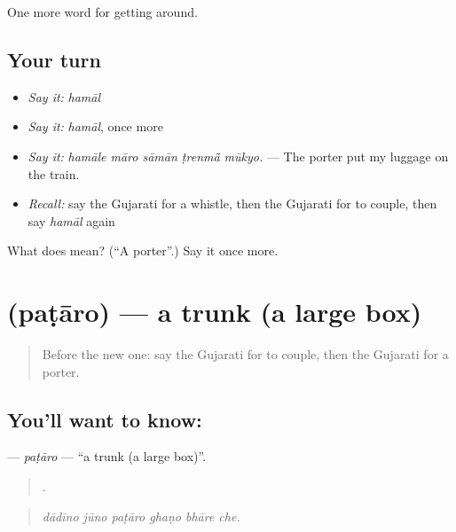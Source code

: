 \begin{grammarlens}[title={What you've built}]
One more word for getting around.
\end{grammarlens}

\subsection*{Your turn}
\begin{itemize}
\raggedright
  \item \emph{Say it:} \emph{hamāl}
  \item \emph{Say it:} \emph{hamāl}, once more
  \item \emph{Say it:} \emph{hamāle māro sāmān ṭrenmā̃ mūkyo.} — The porter put my luggage on the train.
  \item \emph{Recall:} say the Gujarati for a whistle, then the Gujarati for to couple, then say \emph{hamāl} again
\end{itemize}

\begin{tcolorbox}[breakable,colback=teal!4,colframe=teal!35!black,title={Before you move on}]
What does  mean? (\textquotedblleft{}A porter\textquotedblright{}.) Say it once more.
\end{tcolorbox}
\section[\texorpdfstring{\gu{પટારો} (paṭāro)}{પટારો (paṭāro)}]{ (paṭāro) — a trunk (a large box)}

\label{lesson:GU-C394-pataro}



\begin{quote}
Before the new one: say the Gujarati for to couple, then the Gujarati for a porter.
\end{quote}

\subsection*{You'll want to know: }
\textbf{} — \emph{paṭāro} — \textquotedblleft{}a trunk (a large box)\textquotedblright{}.

\begin{quote}
     .
\end{quote}

\begin{quote}
\emph{dādīno jūno paṭāro ghaṇo bhāre che.}
\end{quote}

